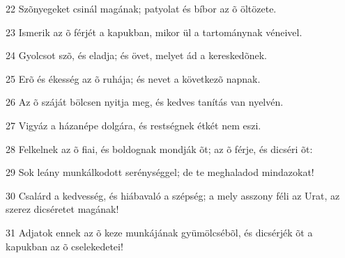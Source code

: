\par 22 Szõnyegeket csinál magának; patyolat és bíbor az õ öltözete.
\par 23 Ismerik az õ férjét a kapukban, mikor ül a tartománynak véneivel.
\par 24 Gyolcsot szõ, és eladja; és övet, melyet ád a kereskedõnek.
\par 25 Erõ és ékesség az õ ruhája; és nevet a következõ napnak.
\par 26 Az õ száját bölcsen nyitja meg, és kedves tanítás van nyelvén.
\par 27 Vigyáz a házanépe dolgára, és restségnek étkét nem eszi.
\par 28 Felkelnek az õ fiai, és boldognak mondják õt; az õ férje, és dicséri õt:
\par 29 Sok leány munkálkodott serénységgel; de te meghaladod mindazokat!
\par 30 Csalárd a kedvesség, és hiábavaló a szépség; a mely asszony féli az Urat, az szerez dicséretet magának!
\par 31 Adjatok ennek az õ keze munkájának gyümölcsébõl, és dicsérjék õt a kapukban az õ cselekedetei!


